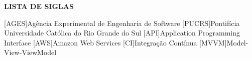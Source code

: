 \begin{center}
  \uppercase{\bfseries Lista de Siglas}\\[3em]
\end{center}

\begin{acronym}[POSTGRESQL]
  [AGES]{Agência Experimental de Engenharia de Software}
  [PUCRS]{Pontifícia Universidade Católica do Rio Grande do Sul}
  [API]{Application Programming Interface}
  [AWS]{Amazon Web Services}
  [CI]{Integração Contínua}
  [MVVM]{Model-View-ViewModel}
\end{acronym}
